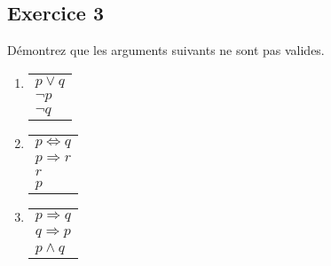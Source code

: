 \subsection*{Exercice 3}
Démontrez que les arguments suivants ne sont pas valides.

\begin{enumerate}
	\item \enter
	
	\begin{flushleft}
	\begin{tabular}{l}
		$p \vee q$ \\
		$\neg p$ \\
	\hline
	$\neg q$
	\end{tabular}
	
\end{flushleft}

	\item \enter
	
	\begin{flushleft}
	\begin{tabular}{l}
		$p \Leftrightarrow q$ \\
		$p \Rightarrow r$ \\
	$r$ \\
	\hline
	$p$
	\end{tabular}
	
\end{flushleft}

	
% 	
% 	

	\item \enter
	
	\begin{flushleft}
	\begin{tabular}{l}
		$p \Rightarrow q$ \\
		$q \Rightarrow p$ \\
	\hline
	$p \wedge q$
	\end{tabular}
	
\end{flushleft}

% 	

\end{enumerate}

